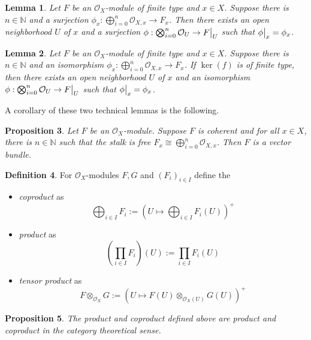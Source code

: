 \documentclass{scrartcl}
\newcommand{\N}{\mathbb{N}}
\renewcommand{\O}{\mathcal{O}}
\newcommand\restr[2]{{
    \left.\kern-\nulldelimiterspace
    #1
    \vphantom{\big|}
    \right|_{#2}
}}
\newtheorem{prop}{Proposition}[section]
\newtheorem{lemma}[prop]{Lemma}
\theoremstyle{definition}
\newtheorem{definition}[prop]{Definition}
\begin{document}
\begin{lemma}
    Let $F$ be an $\O_X$-module of finite type and $x \in X$.
    Suppose there is $n \in \N$ and a surjection $\phi_x: \bigoplus_{i = 0}^n \O_{X, x} \to F_x$.
    Then there exists an open neighborhood $U$ of $x$ and a surjection $\phi: \bigotimes_{i = 0}^n \O_U \to \restr{F}{U}$ such that $\restr{\phi}{x} = \phi_x$.
\end{lemma}
\begin{lemma}
    Let $F$ be an $\O_X$-module of finite type and $x \in X$.
    Suppose there is $n \in \N$ and an isomorphism $\phi_x: \bigoplus_{i = 0}^n \O_{X, x} \to F_x$.
    If $\ker(f)$ is of finite type, then there exists an open neighborhood $U$ of $x$ and an isomorphism $\phi: \bigotimes_{i = 0}^n \O_U \to \restr{F}{U}$ such that $\restr{\phi}{x} = \phi_x$.
\end{lemma}
A corollary of these two technical lemmas is the following.
\begin{prop}
    Let $F$ be an $\O_X$-module.
    Suppose $F$ is coherent and for all $x \in X$, there is $n \in \N$ such that the stalk is free $F_x \cong \bigoplus_{i = 0}^n \O_{X, x}$.
    Then $F$ is a vector bundle.
\end{prop}
\begin{definition}
    For $\O_X$-modules $F, G$ and $(F_i)_{i \in I}$ define the
    \begin{itemize}
        \item \emph{coproduct} as
        \begin{equation*}
            \bigoplus_{i \in I} F_i := \left( U \mapsto \bigoplus_{i \in I} F_i(U) \right)^+
        \end{equation*}
        \item \emph{product} as
        \begin{equation*}
            \left( \prod_{i \in I} F_i \right)(U) := \prod_{i \in I} F_i(U)
        \end{equation*}
        \item \emph{tensor product} as
        \begin{equation*}
            F \otimes_{\O_X} G := \left( U \mapsto F(U) \otimes_{\O_X(U)} G(U) \right)^+
        \end{equation*}
    \end{itemize}
\end{definition}
\begin{prop}
    The product and coproduct defined above are product and coproduct in the category theoretical sense.
\end{prop}
\end{document}
